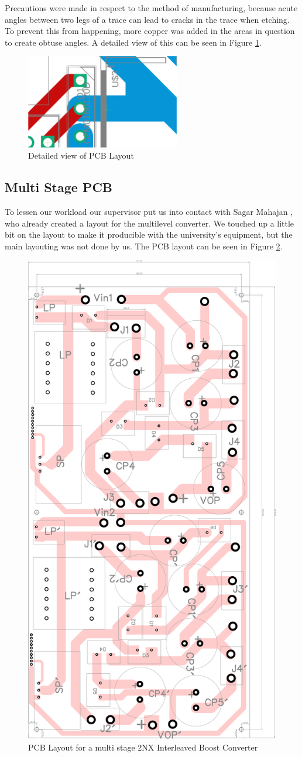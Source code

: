 Precautions were made in respect to the method of manufacturing,
because acute angles between two legs of a trace can lead to cracks in the trace when etching.
To prevent this from happening,
more copper was added in the areas in question to create obtuse angles.
A detailed view of this can be seen in Figure \ref{fig:2nxeagledetail}.
\begin{figure}[H]
	\begin{center}
	\includegraphics[width=0.6\textwidth]{figures/05cPCBdesign/2NX_interleaved_boost_converter_EAGLE_BY_DANIEL_DETAIL.pdf}
	\end{center}
	\caption{Detailed view of PCB Layout}
	\label{fig:2nxeagledetail}
\end{figure}

\subsection{Multi Stage PCB}\label{sub:3sPCB}
To lessen our workload our supervisor put us into contact with Sagar Mahajan ,
who already created a layout for the multilevel converter.
We touched up a little bit on the layout to make it producible with the university's equipment,
but the main layouting was not done by us.
The PCB layout can be seen in Figure \ref{fig:2nxDiptrace}.

\begin{figure}[H]
	\begin{center}
	\includegraphics[height=0.6\textwidth,angle=90]{"figures/05cPCBdesign/DipTrace PCB - 2NX_interleaved_DANIEL_EDIT"}
	\end{center}
	\caption{PCB Layout for a multi stage 2NX Interleaved Boost Converter}
	\label{fig:2nxDiptrace}
\end{figure}

